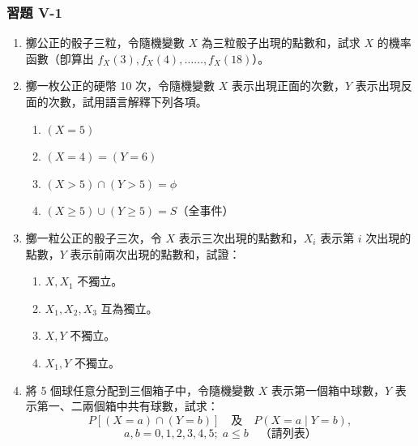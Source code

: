\subsubsection*{習題 V-1}\label{sec:b5-ex5-1}

\begin{enumerate}[label=\textbf{\arabic*.}]
  \item 擲公正的骰子三粒，令隨機變數 $X$ 為三粒骰子出現的點數和，試求 $X$ 的機率函數（卽算出 $f_X(3), f_X(4), \dots\dots, f_X(18)$）。

  \item 擲一枚公正的硬幣 10 次，令隨機變數 $X$ 表示出現正面的次數，$Y$ 表示出現反面的次數，試用語言解釋下列各項。
  \begin{enumerate}[(1)]
    \item $(X = 5)$
    \item $(X = 4) = (Y = 6)$
    \item $(X > 5) \cap (Y > 5) = \phi$
    \item $(X \ge 5) \cup (Y \ge 5) = S$（全事件）
  \end{enumerate}

  \item 擲一粒公正的骰子三次，令 $X$ 表示三次出現的點數和，$X_i$ 表示第 $i$ 次出現的點數，$Y$ 表示前兩次出現的點數和，試證：
  \begin{enumerate}[(1)]
    \item $X, X_1$ 不獨立。
    \item $X_1, X_2, X_3$ 互為獨立。
    \item $X, Y$ 不獨立。
    \item $X_1, Y$ 不獨立。
  \end{enumerate}

  \item 將 5 個球任意分配到三個箱子中，令隨機變數 $X$ 表示第一個箱中球數，$Y$ 表示第一、二兩個箱中共有球數，試求：
  \[
  P[(X = a) \cap (Y = b)] \quad \text{及} \quad P(X = a \mid Y = b),
  \]
  \[
  a, b = 0, 1, 2, 3, 4, 5; \; a \le b \quad \text{（請列表）}
  \]


\end{enumerate}
